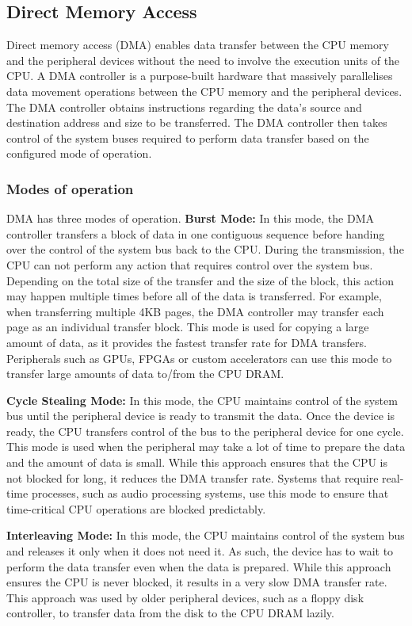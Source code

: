 \subsection{Direct Memory Access}
\label{subsec:interconnect-sc-background-dma}

Direct memory access (DMA) enables data transfer between the CPU memory and the peripheral devices without the need to involve the execution units of the CPU.
A DMA controller is a purpose-built hardware that massively parallelises data movement operations between the CPU memory and the peripheral devices.
The DMA controller obtains instructions regarding the data's source and destination address and size to be transferred.
The DMA controller then takes control of the system buses required to perform data transfer based on the configured mode of operation.

\subsubsection{Modes of operation}
DMA has three modes of operation.
\textbf{Burst Mode:} In this mode, the DMA controller transfers a block of data in one contiguous sequence before handing over the control of the system bus back to the CPU.
During the transmission, the CPU can not perform any action that requires control over the system bus.
Depending on the total size of the transfer and the size of the block, this action may happen multiple times before all of the data is transferred.
For example, when transferring multiple 4KB pages, the DMA controller may transfer each page as an individual transfer block.
This mode is used for copying a large amount of data, as it provides the fastest transfer rate for DMA transfers.
Peripherals such as GPUs, FPGAs or custom accelerators can use this mode to transfer large amounts of data to/from the CPU DRAM.

\textbf{Cycle Stealing Mode:} In this mode, the CPU maintains control of the system bus until the peripheral device is ready to transmit the data.
Once the device is ready, the CPU transfers control of the bus to the peripheral device for one cycle.
This mode is used when the peripheral may take a lot of time to prepare the data and the amount of data is small.
While this approach ensures that the CPU is not blocked for long, it reduces the DMA transfer rate.
Systems that require real-time processes, such as audio processing systems, use this mode to ensure that time-critical CPU operations are blocked predictably.

\textbf{Interleaving Mode:} In this mode, the CPU maintains control of the system bus and releases it only when it does not need it.
As such, the device has to wait to perform the data transfer even when the data is prepared.
While this approach ensures the CPU is never blocked, it results in a very slow DMA transfer rate.
This approach was used by older peripheral devices, such as a floppy disk controller, to transfer data from the disk to the CPU DRAM lazily.